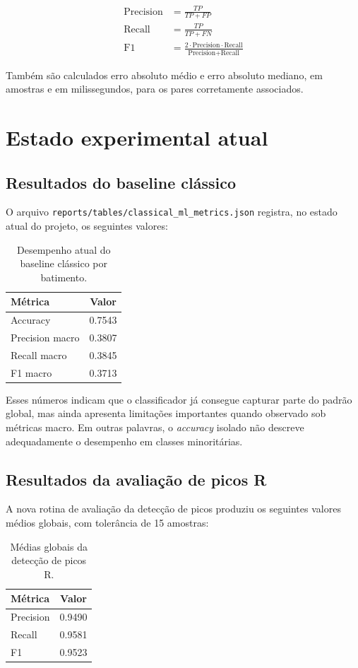 \documentclass[12pt,a4paper]{article}
\begin{document}
\begin{align}
\text{Precision} &= \frac{TP}{TP + FP} \\
\text{Recall} &= \frac{TP}{TP + FN} \\
\text{F1} &= \frac{2 \cdot \text{Precision} \cdot \text{Recall}}{\text{Precision} + \text{Recall}}
\end{align}

Tamb\'em s\~ao calculados erro absoluto m\'edio e erro absoluto mediano, em amostras e em milissegundos, para os pares corretamente associados.

\section{Estado experimental atual}
\subsection{Resultados do baseline cl\'assico}
O arquivo \texttt{reports/tables/classical\_ml\_metrics.json} registra, no estado atual do projeto, os seguintes valores:

\begin{table}[H]
\centering
\begin{tabular}{lc}
\toprule
\textbf{M\'etrica} & \textbf{Valor} \\
\midrule
Accuracy & 0.7543 \\
Precision macro & 0.3807 \\
Recall macro & 0.3845 \\
F1 macro & 0.3713 \\
\bottomrule
\end{tabular}
\caption{Desempenho atual do baseline cl\'assico por batimento.}
\end{table}

Esses n\'umeros indicam que o classificador j\'a consegue capturar parte do padr\~ao global, mas ainda apresenta limita\c{c}\~oes importantes quando observado sob m\'etricas macro. Em outras palavras, o \textit{accuracy} isolado n\~ao descreve adequadamente o desempenho em classes minorit\'arias.

\subsection{Resultados da avalia\c{c}\~ao de picos R}
A nova rotina de avalia\c{c}\~ao da detec\c{c}\~ao de picos produziu os seguintes valores m\'edios globais, com toler\^ancia de 15 amostras:

\begin{table}[H]
\centering
\begin{tabular}{lc}
\toprule
\textbf{M\'etrica} & \textbf{Valor} \\
\midrule
Precision & 0.9490 \\
Recall & 0.9581 \\
F1 & 0.9523 \\
\bottomrule
\end{tabular}
\caption{M\'edias globais da detec\c{c}\~ao de picos R.}
\end{table}
\end{document}
